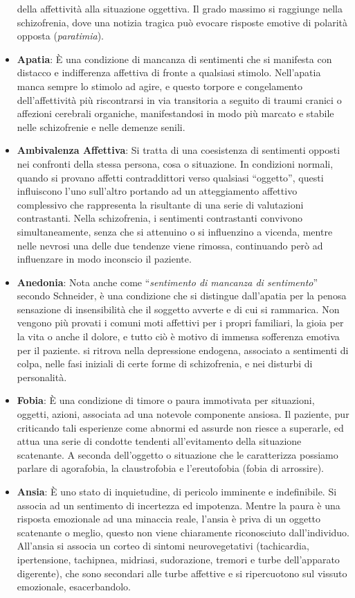 \begin{itemize}
  della affettività alla situazione oggettiva. Il grado massimo si
  raggiunge nella schizofrenia, dove una notizia tragica può evocare
  risposte emotive di polarità opposta (\emph{paratimia}).
\item
  \textbf{Apatia}: È una condizione di mancanza di sentimenti che si
  manifesta con distacco e indifferenza affettiva di fronte a qualsiasi
  stimolo. Nell'apatia manca sempre lo stimolo ad agire, e questo
  torpore e congelamento dell'affettività più riscontrarsi in via
  transitoria a seguito di traumi cranici o affezioni cerebrali
  organiche, manifestandosi in modo più marcato e stabile nelle
  schizofrenie e nelle demenze senili.
\item
  \textbf{Ambivalenza Affettiva}: Si tratta di una coesistenza di
  sentimenti opposti nei confronti della stessa persona, cosa o
  situazione. In condizioni normali, quando si provano affetti
  contraddittori verso qualsiasi ``oggetto'', questi influiscono l'uno
  sull'altro portando ad un atteggiamento affettivo complessivo che
  rappresenta la risultante di una serie di valutazioni contrastanti.
  Nella schizofrenia, i sentimenti contrastanti convivono
  simultaneamente, senza che si attenuino o si influenzino a vicenda,
  mentre nelle nevrosi una delle due tendenze viene rimossa, continuando
  però ad influenzare in modo inconscio il paziente.
\item
  \textbf{Anedonia}: Nota anche come ``\emph{sentimento di mancanza di
  sentimento}'' secondo Schneider, è una condizione che si distingue
  dall'apatia per la penosa sensazione di insensibilità che il soggetto
  avverte e di cui si rammarica. Non vengono più provati i comuni moti
  affettivi per i propri familiari, la gioia per la vita o anche il
  dolore, e tutto ciò è motivo di immensa sofferenza emotiva per il
  paziente. si ritrova nella depressione endogena, associato a
  sentimenti di colpa, nelle fasi iniziali di certe forme di
  schizofrenia, e nei disturbi di personalità.
\item
  \textbf{Fobia}: È una condizione di timore o paura immotivata per
  situazioni, oggetti, azioni, associata ad una notevole componente
  ansiosa. Il paziente, pur criticando tali esperienze come abnormi ed
  assurde non riesce a superarle, ed attua una serie di condotte
  tendenti all'evitamento della situazione scatenante. A seconda
  dell'oggetto o situazione che le caratterizza possiamo parlare di
  agorafobia, la claustrofobia e l'ereutofobia (fobia di arrossire).
\item
  \textbf{Ansia}: È uno stato di inquietudine, di pericolo imminente e
  indefinibile. Si associa ad un sentimento di incertezza ed impotenza.
  Mentre la paura è una risposta emozionale ad una minaccia reale,
  l'ansia è priva di un oggetto scatenante o meglio, questo non viene
  chiaramente riconosciuto dall'individuo. All'ansia si associa un
  corteo di sintomi neurovegetativi (tachicardia, ipertensione,
  tachipnea, midriasi, sudorazione, tremori e turbe dell'apparato
  digerente), che sono secondari alle turbe affettive e si ripercuotono
  sul vissuto emozionale, esacerbandolo.
\end{itemize}

